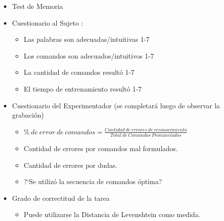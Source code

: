 \begin{itemize}
    \item Test de Memoria
    \item Cuestionario al Sujeto :
    \begin{itemize}
        \item Las palabras son adecuadas/intuitivas 1-7
        \item Los comandos son adecuados/intuitivos 1-7
        \item La cantidad de comandos result\'o 1-7
        \item El tiempo de entrenamiento result\'o 1-7
    \end{itemize}
    \item Cuestionario del Experimentador (se completar\'a luego de observar la grabaci\'on)
    \begin{itemize}
        \item $ \% \: de \: error \: de \: comandos = \frac{Cantidad \:de \:errores \:de \:reconocimiento}{Total \:de \:Comandos \:Pronunciados}$
        \item Cantidad de errores por comandos mal formulados.
        \item Cantidad de errores por dudas.
        \item {?`}Se utiliz\'o la secuencia de comandos \'optima?
    \end{itemize}
    \item Grado de correctitud de la tarea
    \begin{itemize}
    \item Puede utilizarse la Distancia de Levenshtein como medida.
    \end{itemize}
\end{itemize}

